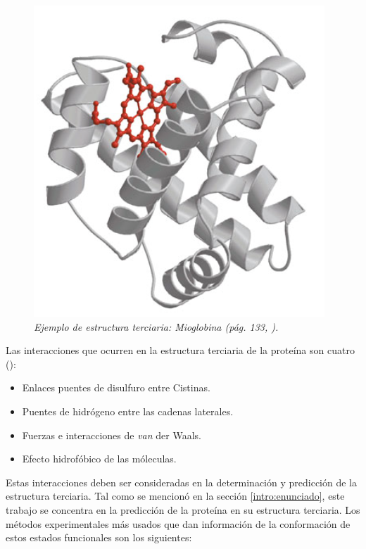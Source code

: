 \begin{figure}[H]
	\centering
	\includegraphics[scale=.5]{images/terciaria.png}
	\caption{\em Ejemplo de estructura terciaria: Mioglobina (pág. 133, \citealp{lehninger}).}
	\label{fig:ter-struct}
\end{figure}

Las interacciones que ocurren en la estructura terciaria de la proteína son cuatro (\citealp{branden:1999}):
\begin{itemize}
	\item Enlaces puentes de disulfuro entre Cistinas.
	\item Puentes de hidrógeno entre las cadenas laterales.
	\item Fuerzas e interacciones de \textit{van} der Waals.
	\item Efecto hidrofóbico de las móleculas.
\end{itemize}

Estas interacciones deben ser consideradas en la determinación y predicción de la estructura terciaria. Tal como se mencionó en la sección \ref{intro:enunciado}, este trabajo se concentra en la predicción de la proteína en su estructura terciaria. Los métodos experimentales más usados que dan información de la conformación de estos estados funcionales son los siguientes:

